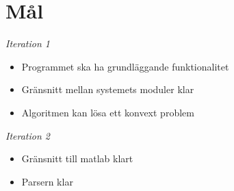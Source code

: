 \section{Mål}
\emph{Iteration 1}
\begin{itemize}
\item Programmet ska ha grundläggande funktionalitet
\item Gränsnitt mellan systemets moduler klar
\item Algoritmen kan lösa ett konvext problem
\end{itemize} 
\emph{Iteration 2}
\begin{itemize}
\item Gränsnitt till matlab klart
\item Parsern klar
\end{itemize}